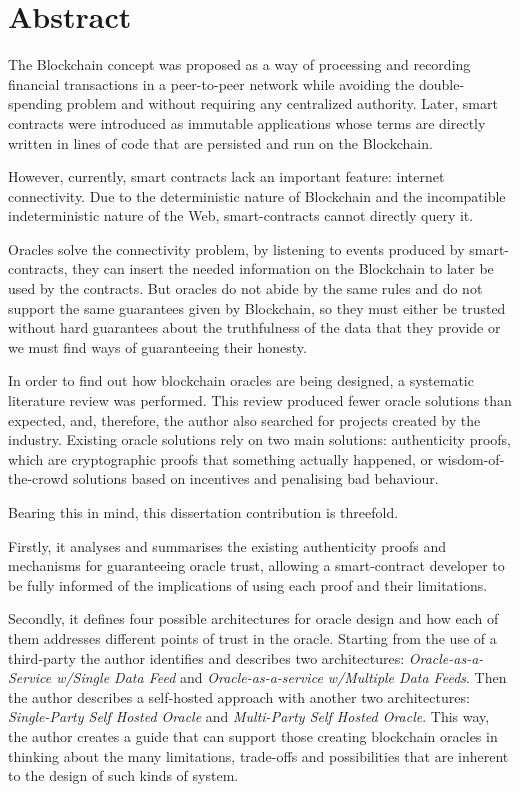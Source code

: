 \chapter*{Abstract}

The Blockchain concept was proposed as a way of processing and recording financial transactions in a peer-to-peer network while avoiding the double-spending problem and without requiring any centralized authority. Later, smart contracts were introduced as immutable applications whose terms are directly written in lines of code that are persisted and run on the Blockchain.

However, currently, smart contracts lack an important feature: internet connectivity. Due to the deterministic nature of Blockchain and the incompatible indeterministic nature of the Web, smart-contracts cannot directly query it.

Oracles solve the connectivity problem, by listening to events produced by smart-contracts, they can insert the needed information on the Blockchain to later be used by the contracts. But oracles do not abide by the same rules and do not support the same guarantees given by Blockchain, so they must either be trusted without hard guarantees about the truthfulness of the data that they provide or we must find ways of guaranteeing their honesty.

In order to find out how blockchain oracles are being designed, a systematic literature review was performed. This review produced fewer oracle solutions than expected, and, therefore, the author also searched for projects created by the industry. Existing oracle solutions rely on two main solutions: authenticity proofs, which are cryptographic proofs that something actually happened, or wisdom-of-the-crowd solutions based on incentives and penalising bad behaviour.

Bearing this in mind, this dissertation contribution is threefold.

Firstly, it analyses and summarises the existing authenticity proofs and mechanisms for guaranteeing oracle trust, allowing a smart-contract developer to be fully informed of the implications of using each proof and their limitations.

Secondly, it defines four possible architectures for oracle design and how each of them addresses different points of trust in the oracle. Starting from the use of a third-party the author identifies and describes two architectures: \textit{Oracle-as-a-Service w/Single Data Feed} and \textit{Oracle-as-a-service w/Multiple Data Feeds}. Then the author describes a self-hosted approach with another two architectures: \textit{Single-Party Self Hosted Oracle} and \textit{Multi-Party Self Hosted Oracle}. This way, the author creates a guide that can support those creating blockchain oracles in thinking about the many limitations, trade-offs and possibilities that are inherent to the design of such kinds of system.

